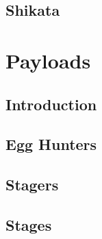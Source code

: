 \documentclass{beamer}
\begin{document}
\subsection{Shikata}

\section{Payloads}
\subsection{Introduction}

\subsection{Egg Hunters}
\subsection{Stagers}
\subsection{Stages}
\end{document}
